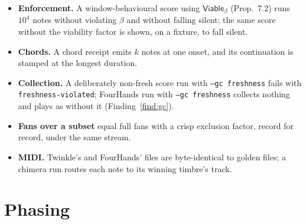 \documentclass[11pt,a4paper]{article}
\theoremstyle{definition}
\theoremstyle{remark}
\begin{document}
\begin{itemize}[leftmargin=*,itemsep=2pt]
  between two timbres alternates note by note (\S7.4).
\item \textbf{Enforcement.} A window-behavioural score using
  $\mathsf{Viable}_\beta$ (Prop.~7.2) runs $10^4$ notes without violating
  $\beta$ and without falling silent; the same score without the viability
  factor is shown, on a fixture, to fall silent.
\item \textbf{Chords.} A chord receipt emits $k$ notes at one onset, and its
  continuation is stamped at the longest duration.
\item \textbf{Collection.} A deliberately non-fresh score run with
  \texttt{--gc freshness} fails with \texttt{freshness-violated}; FourHands run
  with \texttt{--gc freshness} collects nothing and plays as without it
  (Finding~\ref{find:gc}).
\item \textbf{Fans over a subset} equal full fans with a crisp exclusion factor,
  record for record, under the same stream.
\item \textbf{MIDI.} Twinkle's and FourHands' files are byte-identical to golden
  files; a chimera run routes each note to its winning timbre's track.
\end{itemize}

\section{Phasing}\label{sec:phases}
\end{document}
